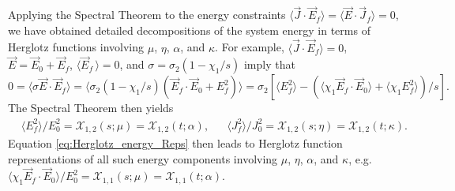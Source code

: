 \documentclass[english,12pt,jmp,graphicx]{revtex4-1}
\begin{document}
Applying the Spectral Theorem to the energy constraints
$\langle\vec{J}\cdot\vec{E}_f\rangle=\langle\vec{E}\cdot\vec{J}_f\rangle=0$, we have obtained detailed
decompositions of the system energy in terms of Herglotz functions
involving $\mu$, $\eta$, $\alpha$, and $\kappa$. For example, $\langle\vec{J}\cdot\vec{E}_f\rangle=0$,
$\vec{E}=\vec{E}_0+\vec{E}_f$, $\langle\vec{E}_f\,\rangle=0$, and
$\sigma=\sigma_2(1-\chi_1/s)$ imply that $0=\langle\sigma\vec{E}\cdot\vec{E}_f\rangle=\langle\sigma_2(1-\chi_1/s)(\vec{E}_f\cdot\vec{E}_0+E_f^2)\rangle
  =\sigma_2\left[\langle E_f^2\rangle- (\langle\chi_1\vec{E}_f\cdot\vec{E}_0\rangle
      + \langle\chi_1E_f^2\rangle)/s\right].$
The Spectral Theorem \cite{Reed-1980} then yields
%
\begin{align}\label{eq:Herglotz_energy_Reps}
 &\langle E_f^2\rangle/E_0^2=\mathcal{X}_{1,2}(s;\mu)=\mathcal{X}_{1,2}(t;\alpha),
 &&\langle J_f^2\rangle/J_0^2=\mathcal{X}_{1,2}(s;\eta)=\mathcal{X}_{1,2}(t;\kappa).
\end{align}
%
Equation \eqref{eq:Herglotz_energy_Reps} then leads to Herglotz
function representations of all such energy components involving $\mu$,
$\eta$, $\alpha$, and $\kappa$,
e.g. $\langle\chi_1\vec{E}_f\cdot\vec{E}_0\rangle/E_0^2=\mathcal{X}_{1,1}(s;\mu)=\mathcal{X}_{1,1}(t;\alpha)$. 
\end{document}
